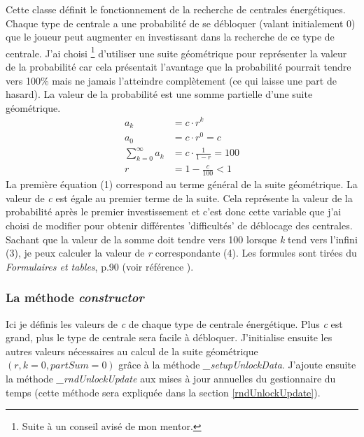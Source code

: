 \documentclass{article}
\begin{document}
		Cette classe définit le fonctionnement de la recherche de centrales énergétiques.
		Chaque type de centrale a une probabilité de se débloquer (valant initialement 0) que le joueur peut augmenter en investissant dans la recherche de ce type de centrale. J'ai choisi \footnote{Suite à un conseil avisé de mon mentor.} d'utiliser une suite géométrique pour représenter la valeur de la probabilité car cela présentait l'avantage que la probabilité pourrait tendre vers 100\% mais ne jamais l'atteindre complètement (ce qui laisse une part de hasard).
		La valeur de la probabilité est une somme partielle d'une suite géométrique.
		\begin{align}
  			a_{k} &= c\cdot r^{k} \\
    			a_{0} &= c\cdot r^{0} = c \\
    			\sum_{k=0}^{\infty} a_{k} &= c\cdot \frac{1}{1-r} = 100 \\
    			r &= 1 - \frac{c}{100} < 1
		\end{align}
		La première équation (1) correspond au terme général de la suite géométrique.
		La valeur de \textit{c} est égale au premier terme de la suite. Cela représente la valeur de la probabilité après le premier investissement et c'est donc cette variable que j'ai choisi de modifier pour obtenir différentes 'difficultés' de déblocage des centrales. Sachant que la valeur de la somme doit tendre vers 100 lorsque \textit{k} tend vers l'infini (3), je peux calculer la valeur de \textit{r} correspondante (4). Les formules sont tirées du \textit{Formulaires et tables}, p.90 (voir référence \cite{FetT}).
		
        
        \subsubsection{La méthode \textit{constructor}}
        Ici je définis les valeurs de \textit{c} de chaque type de centrale énergétique. Plus \textit{c} est grand, plus le type de centrale sera facile à débloquer. J'initialise ensuite les autres valeurs nécessaires au calcul de la suite géométrique $(r, k=0, partSum=0)$ grâce à la méthode \textit{\_setupUnlockData}. J'ajoute ensuite la méthode \textit{\_rndUnlockUpdate} aux mises à jour annuelles du gestionnaire du temps (cette méthode sera expliquée dans la section \ref{rndUnlockUpdate}).
        
\end{document}
